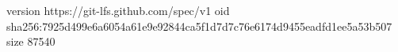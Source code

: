 version https://git-lfs.github.com/spec/v1
oid sha256:7925d499e6a6054a61e9e92844ca5f1d7d7c76e6174d9455eadfd1ee5a53b507
size 87540
